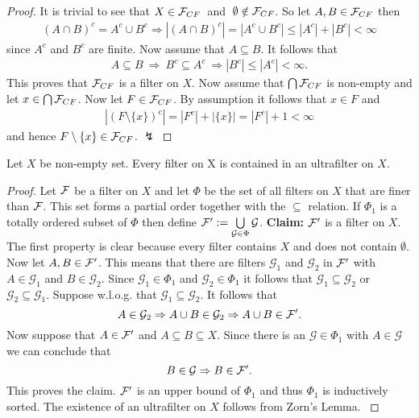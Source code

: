 \begin{proof}
  It is trivial to see that $X \in \mathcal{F}_{CF}\:$ and $\:\emptyset \notin \mathcal{F}_{CF}$. So let $A, B \in \mathcal{F}_{CF}$ then
  \begin{align*}
    (A \cap B)^c = A^c \cup B^c \Rightarrow \left| (A \cap B)^c \right| = \left | A^c \cup B^c \right| \leq \left| A^c \right| + \left| B^c \right| < \infty
  \end{align*}
  since $A^c$ and $B^c$ are finite.
  Now assume that $A \subseteq B$. It follows that
  \begin{align*}
    A \subseteq B \: \Rightarrow \: B^c \subseteq A^c \: \Rightarrow \left|B^c\right| \leq \left|A^c\right| < \infty.
  \end{align*}
  This proves that $\mathcal{F}_{CF}$ is a filter on $X$.
  Now assume that $\bigcap \mathcal{F}_{CF}$ is non-empty and let $x \in \bigcap \mathcal{F}_{CF}$. Now let $F \in \mathcal{F}_{CF}$. By assumption it follows that $x \in F$ and
  \begin{align*}
    \left|(F\setminus \{x\})^c\right| = \left| F^c \right| + \left| \{x \} \right| = \left| F^c \right| + 1 < \infty
  \end{align*}
  and hence $F\setminus \{x\} \in \mathcal{F}_{CF}$. $\lightning$
\end{proof}

\begin{thm}\label{thm:ulfil}
  Let $X$ be non-empty set. Every filter on X is contained in an ultrafilter on $X$.
\end{thm}

\begin{proof}
  Let $\mathcal{F}$ be a filter on $X$ and let $\Phi$ be the set of all filters on $X$ that are finer than $\mathcal{F}$. This set forms a partial order together with the $\subseteq$ relation.
  If $\Phi_1$ is a totally ordered subset of $\Phi$ then define $\mathcal{F}' := \bigcup\limits_{\mathcal{G} \in \Phi} \mathcal{G}$.
  \textbf{Claim: } $\mathcal{F}'$ is a filter on $X$. The first property is clear because every filter contains $X$ and does not contain $\emptyset$.
  Now let $A, B \in \mathcal{F}'$. This means that there are filters $\mathcal{G}_1$ and $\mathcal{G}_2$ in $\mathcal{F}'$ with $A \in \mathcal{G}_1$ and $B \in \mathcal{G}_2$.
  Since $\mathcal{G}_1 \in \Phi_1$ and $\mathcal{G}_2 \in \Phi_1$ it follows that $\mathcal{G}_1 \subseteq \mathcal{G}_2$ or $\mathcal{G}_2 \subseteq \mathcal{G}_1$. Suppose w.l.o.g. that $\mathcal{G}_1 \subseteq \mathcal{G}_2$.
  It follows that
  \begin{equation*}
    A \in \mathcal{G}_2 \Rightarrow A \cup B \in \mathcal{G}_2 \Rightarrow A \cup B \in \mathcal{F}'.
  \end{equation*}
  Now suppose that $A \in \mathcal{F}'$ and $A \subseteq B \subseteq X$. Since there is an $\mathcal{G} \in \Phi_1$ with $A \in \mathcal{G}$ we can conclude that
  \begin{equation*}
    B \in \mathcal{G} \Rightarrow B \in \mathcal{F}'.
  \end{equation*}
  This proves the claim. $\mathcal{F}'$ is an upper bound of $\Phi_1$ and thus $\Phi_1$ is inductively sorted. The existence of an ultrafilter on $X$ follows from Zorn's Lemma. \cite[5.12 Satz]{BvQMT}
\end{proof}

